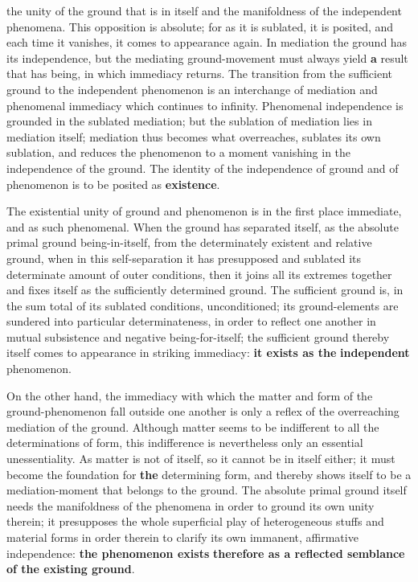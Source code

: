 \documentclass[12pt,a4paper,openany]{book}
\newcommand{\opage}[1]{\marginnote{\footnotesize\textit{[#1]}}}
\begin{document}
the unity of the ground that is in itself and the manifoldness of the independent
phenomena. This opposition is
absolute; for as it is sublated, it is posited, and each
time it vanishes, it comes to appearance again. In
\setcounter{footnote}{0}%
\opage{158}mediation the ground has its independence, but the
mediating ground-movement must always yield \textbf{a} result that has being, in which immediacy returns.
The transition from the sufficient ground to the independent
phenomenon is an interchange of mediation and
phenomenal immediacy which continues to
infinity. Phenomenal independence is grounded
in the sublated mediation; but the sublation of mediation
lies in mediation itself; mediation thus becomes
what overreaches, sublates its own sublation, and
reduces the phenomenon to a moment vanishing in the independence
of the ground. The identity of the independence of ground
and of phenomenon is to be posited as
\textbf{existence}.

The existential unity of ground and phenomenon
is in the first place immediate, and as such phenomenal.
When the ground has separated itself, as the absolute
primal ground being-in-itself, from the determinately existent and relative
ground, when in this self-separation it has
presupposed and sublated its determinate amount of outer conditions,
then it joins all its extremes together and
fixes itself as the sufficiently determined ground. The
sufficient ground is, in the sum total of its sublated
conditions, unconditioned; its ground-elements are sundered into
particular determinateness, in order to reflect one another in mutual subsistence and negative
being-for-itself; the sufficient
ground thereby itself comes to appearance in striking immediacy:
\textbf{it exists as the} \textbf{independent} phenomenon.

On the other hand, the immediacy with which
the matter and form of the ground-phenomenon fall outside
one another is only a reflex of the overreaching
mediation of the ground. Although matter seems to be indifferent
to all the determinations of form, this
\setcounter{footnote}{0}%
\opage{159}indifference is nevertheless only an essential unessentiality. As
matter is not of itself, so it cannot
be in itself either; it must become the foundation for \textbf{the} determining
form, and thereby shows itself to be a mediation-moment
that belongs to the ground. The absolute
primal ground itself needs the manifoldness of the phenomena
in order to ground its own unity therein; it presupposes
the whole superficial play of heterogeneous stuffs and material
forms in order therein to clarify its own immanent,
affirmative independence: \textbf{the phenomenon exists}
\textbf{therefore as a reflected semblance} \textbf{of the existing
ground}.
\end{document}

